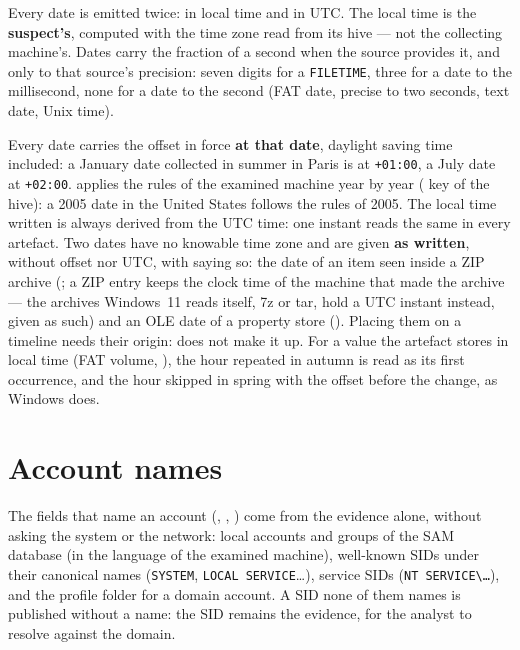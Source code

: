 \documentclass[11pt,a4paper,oneside]{report}
\begin{document}
Every date is emitted twice:  in local time and  in UTC.
The local time is the \textbf{suspect's}, computed with the time zone read from
its  hive — not the collecting machine's. Dates carry the
fraction of a second when the source provides it, and only to that source's
precision: seven digits for a \texttt{FILETIME}, three for a date to the
millisecond, none for a date to the second (FAT date, precise to two seconds,
text date, Unix time).

Every date carries the offset in force \textbf{at that date}, daylight saving
time included: a January date collected in summer in Paris is at
\texttt{+01:00}, a July date at \texttt{+02:00}. \wac{} applies the rules of
the examined machine year by year ( key of the
 hive): a 2005 date in the United States follows the rules
of 2005. The local time written is always derived from the UTC time: one instant
reads the same in every artefact. Two dates have no knowable time zone and
are given \textbf{as written}, without offset nor UTC, with 
saying so: the date of an item seen inside a ZIP archive
(; a ZIP entry keeps the clock time of the machine
that made the archive — the archives Windows~11 reads itself, 7z or tar,
hold a UTC instant instead, given as such) and an OLE date of a property store
(). Placing them on a timeline needs their origin: \wac{}
does not make it up. For a value the artefact stores in local
time (FAT volume, ), the hour repeated in autumn is read as its first occurrence, and the
hour skipped in spring with the offset before the change, as Windows does.

\section{Account names}

The fields that name an account (, ,
) come from the evidence alone, without asking the system or
the network: local accounts and groups of the SAM database (in the language
of the examined machine), well-known SIDs under their canonical names
(\texttt{SYSTEM}, \texttt{LOCAL SERVICE}\ldots), service SIDs
(\texttt{NT SERVICE\textbackslash\ldots}), and the profile folder for a
domain account. A SID none of them names is published without a name: the SID
remains the evidence, for the analyst to resolve against the domain.
\end{document}
